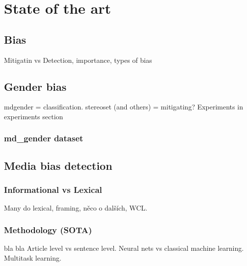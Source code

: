 \chapter{State of the art}

\section{Bias}
Mitigatin vs Detection, importance, types of bias
\section{Gender bias}
mdgender = classification. stereoset (and others) = mitigating?
Experiments in experiments section
\subsection{md\_gender dataset}
\section{Media bias detection}
\subsection{Informational vs Lexical}
Many do lexical, framing, něco o dalších, WCL.
\subsection{Methodology (SOTA)}\label{methodology}
bla bla Article level vs sentence level. Neural nets vs classical machine learning. Multitask learning.



